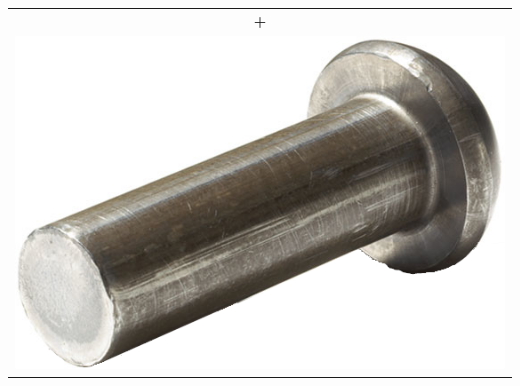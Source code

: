\documentclass[compress,table,8pt]{beamer}
\begin{document}
\begin{frame}
\begin{columns}
\begin{column}{.25\linewidth}
\begin{tabular}{c}
        {\color{gray!75!black}\bfseries\fontsize{48}{0}\selectfont +}\\
        \includegraphics[width=\linewidth]{rivet}
      \end{tabular}
    \end{column}
  \end{columns}
\end{frame}
\end{document}
